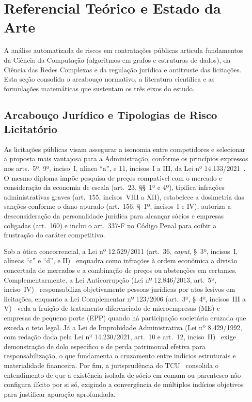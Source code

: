 \section{Referencial Teórico e Estado da Arte}
\label{sec:referencial}

A análise automatizada de riscos em contratações públicas articula fundamentos da Ciência da Computação (algoritmos em grafos e estruturas de dados), da Ciência das Redes Complexas e da regulação jurídica e antitruste das licitações. Esta seção consolida o arcabouço normativo, a literatura científica e as formulações matemáticas que sustentam os três eixos do estudo.

\subsection{Arcabouço Jurídico e Tipologias de Risco Licitatório}

As licitações públicas visam assegurar a isonomia entre competidores e selecionar a proposta mais vantajosa para a Administração, conforme os princípios expressos nos arts.~5º, 9º, inciso~I, alínea ``a'', e 11, incisos~I a III, da Lei nº 14.133/2021~\cite{brasil2021licitacoes}. O mesmo diploma impõe pesquisa de preços compatível com o mercado e consideração da economia de escala (art.~23, §§~1º e 4º), tipifica infrações administrativas graves (art.~155, incisos~VIII a XII), estabelece a dosimetria das sanções conforme o dano apurado (art.~156, §~1º, incisos~I e IV), autoriza a desconsideração da personalidade jurídica para alcançar sócios e empresas coligadas (art.~160) e inclui o art.~337-F no Código Penal para coibir a frustração do caráter competitivo.

Sob a ótica concorrencial, a Lei nº 12.529/2011 (art.~36, \textit{caput}, §~3º, incisos~I, alíneas ``c'' e ``d'', e II)~\cite{brasil2011concorrencia} enquadra como infrações à ordem econômica a divisão concertada de mercados e a combinação de preços ou abstenções em certames. Complementarmente, a Lei Anticorrupção (Lei nº 12.846/2013, art.~5º, inciso~IV)~\cite{brasil2013anticorrupcao} responsabiliza objetivamente pessoas jurídicas por atos lesivos em licitações, enquanto a Lei Complementar nº 123/2006 (art.~3º, §~4º, incisos~III a V)~\cite{brasil2006lc123} veda a fruição de tratamento diferenciado de microempresas (ME) e empresas de pequeno porte (EPP) quando há participação societária cruzada que exceda o teto legal. Já a Lei de Improbidade Administrativa (Lei nº 8.429/1992, com redação dada pela Lei nº 14.230/2021, art.~10 e art.~12, inciso~II)~\cite{brasil1992improbidade} exige demonstração de dolo específico e de perda patrimonial efetiva para responsabilização, o que fundamenta o cruzamento entre indícios estruturais e materialidade financeira. Por fim, a jurisprudência do TCU~\cite{tcu2011acordao2341,tcu2024acordao1798} consolida o entendimento de que a existência isolada de sócio em comum ou parentesco não configura ilícito por si só, exigindo a convergência de múltiplos indícios objetivos para justificar apuração aprofundada.

